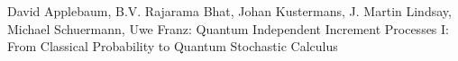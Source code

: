\documentclass{article}
\begin{document}

\begin{thebibliography}{}
 David Applebaum, B.V. Rajarama Bhat, Johan Kustermans, J. Martin Lindsay, Michael Schuermann, Uwe Franz: Quantum Independent Increment Processes I: From Classical Probability to Quantum Stochastic Calculus

\end{thebibliography}
\end{document}
